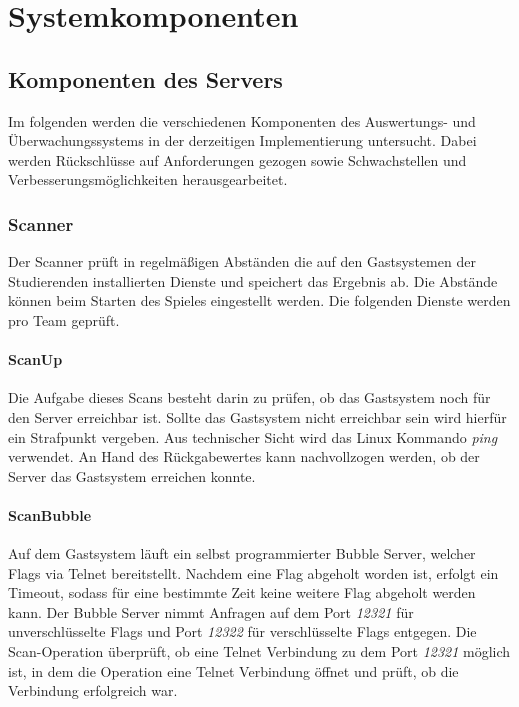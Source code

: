 \section{Systemkomponenten}\label{sec:Systemkomponenten}

\subsection{Komponenten des Servers}\label{subsec:Komponente_des_Servers}
Im folgenden werden die verschiedenen Komponenten des Auswertungs- und Überwachungssystems in der derzeitigen Implementierung untersucht. Dabei werden Rückschlüsse auf Anforderungen gezogen sowie Schwachstellen und Verbesserungsmöglichkeiten herausgearbeitet.

\subsubsection{Scanner}\label{subsubsec:Scanner}
Der Scanner prüft in regelmäßigen Abständen die auf den Gastsystemen der Studierenden installierten Dienste und speichert das Ergebnis ab. Die Abstände können beim Starten des Spieles eingestellt werden. Die folgenden Dienste werden pro Team geprüft.

\paragraph{ScanUp}\label{para:ScanUp}
Die Aufgabe dieses Scans besteht darin zu prüfen, ob das Gastsystem noch für den Server erreichbar ist. Sollte das Gastsystem nicht erreichbar sein wird hierfür ein Strafpunkt vergeben. Aus technischer Sicht wird das Linux Kommando \textit{ping} verwendet. An Hand des Rückgabewertes kann nachvollzogen werden, ob der Server das Gastsystem erreichen konnte.

\paragraph{ScanBubble}\label{para:ScanBubble}
Auf dem Gastsystem läuft ein selbst programmierter Bubble Server, welcher Flags via Telnet bereitstellt. Nachdem eine Flag abgeholt worden ist, erfolgt ein Timeout, sodass für eine bestimmte Zeit keine weitere Flag abgeholt werden kann. Der Bubble Server nimmt Anfragen auf dem Port \textit{12321} für unverschlüsselte Flags und Port \textit{12322} für verschlüsselte Flags entgegen.
Die Scan-Operation überprüft, ob eine Telnet Verbindung zu dem Port \textit{12321} möglich ist, in dem die Operation eine Telnet Verbindung öffnet und prüft, ob die Verbindung erfolgreich war.

